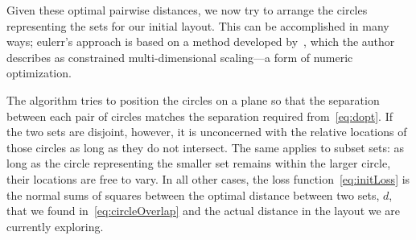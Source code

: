 \documentclass[
  oneside,
  openany,
  numbers=noendperiod,
  parskip=half,
  bibliography=totoc
]{scrbook}\usepackage[]{graphicx}\usepackage{xcolor}
\newcommand{\pkg}[1]{{\fontseries{b}\selectfont #1}}
\begin{document}
Given these optimal pairwise distances, we now try to arrange
the circles representing the sets for our initial layout. This can be
accomplished in many ways; \pkg{eulerr}'s approach is based on a method
developed by~\citet{Frederickson_2015}, which the author describes as
constrained multi-dimensional scaling---a form of numeric optimization.

The algorithm tries to position the circles on a plane so that the separation
between each pair of circles matches the separation required from~\eqref{eq:dopt}.
If the two sets are disjoint, however, it is unconcerned with the relative
locations of those circles as long as they do not intersect. The same
applies to subset sets: as long as the circle representing the smaller set
remains within the larger circle, their locations are free to vary.
In all other cases, the loss function~\eqref{eq:initLoss} is the normal sums of
squares between the optimal distance between two sets, $d$, that we found
in~\eqref{eq:circleOverlap} and the actual distance in the layout we are
currently exploring.
\end{document}
